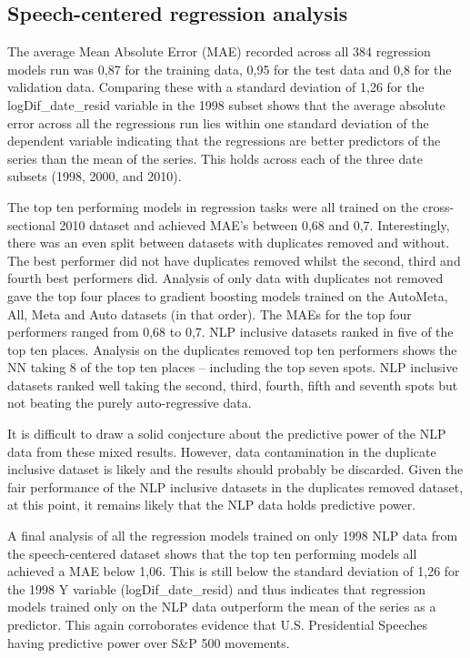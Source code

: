 \documentclass[11pt,preprint, authoryear]{elsarticle}
\numberwithin{equation}{section}
\numberwithin{figure}{section}
\numberwithin{table}{section}
\begin{document}
\hypertarget{speech-centered-regression-analysis}{%
\subsection{Speech-centered regression
analysis}\label{speech-centered-regression-analysis}}

The average Mean Absolute Error (MAE) recorded across all 384 regression
models run was 0,87 for the training data, 0,95 for the test data and
0,8 for the validation data. Comparing these with a standard deviation
of 1,26 for the logDif\_date\_resid variable in the 1998 subset shows
that the average absolute error across all the regressions run lies
within one standard deviation of the dependent variable indicating that
the regressions are better predictors of the series than the mean of the
series. This holds across each of the three date subsets (1998, 2000,
and 2010).

The top ten performing models in regression tasks were all trained on
the cross-sectional 2010 dataset and achieved MAE's between 0,68 and
0,7. Interestingly, there was an even split between datasets with
duplicates removed and without. The best performer did not have
duplicates removed whilst the second, third and fourth best performers
did. Analysis of only data with duplicates not removed gave the top four
places to gradient boosting models trained on the AutoMeta, All, Meta
and Auto datasets (in that order). The MAEs for the top four performers
ranged from 0,68 to 0,7. NLP inclusive datasets ranked in five of the
top ten places. Analysis on the duplicates removed top ten performers
shows the NN taking 8 of the top ten places -- including the top seven
spots. NLP inclusive datasets ranked well taking the second, third,
fourth, fifth and seventh spots but not beating the purely
auto-regressive data.

It is difficult to draw a solid conjecture about the predictive power of
the NLP data from these mixed results. However, data contamination in
the duplicate inclusive dataset is likely and the results should
probably be discarded. Given the fair performance of the NLP inclusive
datasets in the duplicates removed dataset, at this point, it remains
likely that the NLP data holds predictive power.

A final analysis of all the regression models trained on only 1998 NLP
data from the speech-centered dataset shows that the top ten performing
models all achieved a MAE below 1,06. This is still below the standard
deviation of 1,26 for the 1998 Y variable (logDif\_date\_resid) and thus
indicates that regression models trained only on the NLP data outperform
the mean of the series as a predictor. This again corroborates evidence
that U.S. Presidential Speeches having predictive power over S\&P 500
movements.
\end{document}
